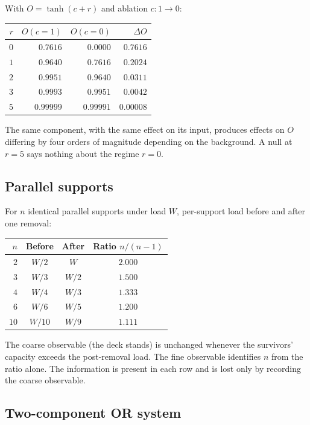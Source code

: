 \documentclass[11pt]{article}
\theoremstyle{definition}
\theoremstyle{remark}
\begin{document}
With $O=\tanh(c+r)$ and ablation $c:1\to 0$:
\begin{center}
\small
\begin{tabular}{rrrr}
\toprule
$r$ & $O(c=1)$ & $O(c=0)$ & $\Delta O$\\
\midrule
$0$ & $0.7616$ & $0.0000$ & $0.7616$\\
$1$ & $0.9640$ & $0.7616$ & $0.2024$\\
$2$ & $0.9951$ & $0.9640$ & $0.0311$\\
$3$ & $0.9993$ & $0.9951$ & $0.0042$\\
$5$ & $0.99999$ & $0.99991$ & $0.00008$\\
\bottomrule
\end{tabular}
\end{center}
The same component, with the same effect on its input, produces effects on $O$ differing by four orders of magnitude depending on the background. A null at $r=5$ says nothing about the regime $r=0$.

\subsection{Parallel supports}

For $n$ identical parallel supports under load $W$, per-support load before and after one removal:
\begin{center}
\small
\begin{tabular}{rccc}
\toprule
$n$ & Before & After & Ratio $n/(n-1)$\\
\midrule
$2$ & $W/2$ & $W$ & $2.000$\\
$3$ & $W/3$ & $W/2$ & $1.500$\\
$4$ & $W/4$ & $W/3$ & $1.333$\\
$6$ & $W/6$ & $W/5$ & $1.200$\\
$10$ & $W/10$ & $W/9$ & $1.111$\\
\bottomrule
\end{tabular}
\end{center}
The coarse observable (the deck stands) is unchanged whenever the survivors' capacity exceeds the post-removal load. The fine observable identifies $n$ from the ratio alone. The information is present in each row and is lost only by recording the coarse observable.

\subsection{Two-component OR system}
\end{document}
